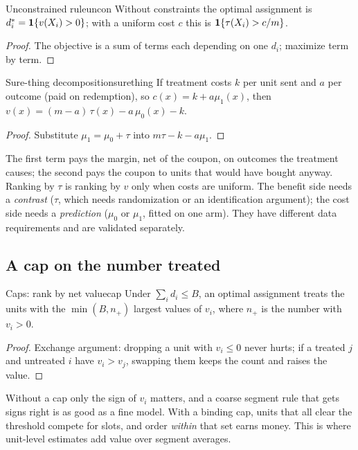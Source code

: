 \documentclass[11pt]{article}
\begin{document}
\begin{prop}{Unconstrained rule}{uncon}
Without constraints the optimal assignment is $d_i^\ast = \mathbf{1}\{v(X_i) > 0\}$; with a uniform cost $c$ this is
$\mathbf{1}\{\tau(X_i) > c/m\}$.
\end{prop}
\begin{proof}
The objective is a sum of terms each depending on one $d_i$; maximize term by term.
\end{proof}

\begin{prop}{Sure-thing decomposition}{surething}
If treatment costs $k$ per unit sent and $a$ per outcome (paid on redemption), so $c(x) = k + a\mu_1(x)$, then
$v(x) = (m - a)\,\tau(x) - a\,\mu_0(x) - k$.
\end{prop}
\begin{proof}
Substitute $\mu_1 = \mu_0 + \tau$ into $m\tau - k - a\mu_1$.
\end{proof}

The first term pays the margin, net of the coupon, on outcomes the treatment causes; the second pays the coupon to units
that would have bought anyway. Ranking by $\tau$ is ranking by $v$ only when costs are uniform. The benefit side needs a
\emph{contrast} ($\tau$, which needs randomization or an identification argument); the cost side needs a
\emph{prediction} ($\mu_0$ or $\mu_1$, fitted on one arm). They have different data requirements and are validated
separately.

\subsection{A cap on the number treated}

\begin{prop}{Caps: rank by net value}{cap}
Under $\sum_i d_i \le B$, an optimal assignment treats the units with the $\min(B, n_+)$ largest values of $v_i$, where
$n_+$ is the number with $v_i > 0$.
\end{prop}
\begin{proof}
Exchange argument: dropping a unit with $v_i \le 0$ never hurts; if a treated $j$ and untreated $i$ have $v_i > v_j$,
swapping them keeps the count and raises the value.
\end{proof}

Without a cap only the sign of $v_i$ matters, and a coarse segment rule that gets signs right is as good as a fine
model. With a binding cap, units that all clear the threshold compete for slots, and order \emph{within} that set earns
money. This is where unit-level estimates add value over segment averages.
\end{document}
